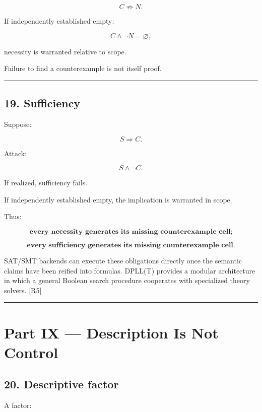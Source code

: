 \documentclass[
]{article}
\begin{document}
\[
C\not\Rightarrow N.
\]

If independently established empty:

\[
C\land\neg N=\varnothing,
\]

necessity is warranted relative to scope.

Failure to find a counterexample is not itself proof.

\begin{center}\rule{0.5\linewidth}{0.5pt}\end{center}

\subsection{19. Sufficiency}\label{sufficiency}

Suppose:

\[
S\Rightarrow C.
\]

Attack:

\[
\boxed{
S\land\neg C.
}
\]

If realized, sufficiency fails.

If independently established empty, the implication is warranted in
scope.

Thus:

\[
\boxed{
\textbf{every necessity generates its missing counterexample cell;}
}
\]

\[
\boxed{
\textbf{every sufficiency generates its missing counterexample cell.}
}
\]

SAT/SMT backends can execute these obligations directly once the
semantic claims have been reified into formulas. DPLL(T) provides a
modular architecture in which a general Boolean search procedure
cooperates with specialized theory solvers. {[}R5{]}

\begin{center}\rule{0.5\linewidth}{0.5pt}\end{center}

\section{Part IX --- Description Is Not
Control}\label{part-ix-description-is-not-control}

\subsection{20. Descriptive factor}\label{descriptive-factor}

A factor:
\end{document}
